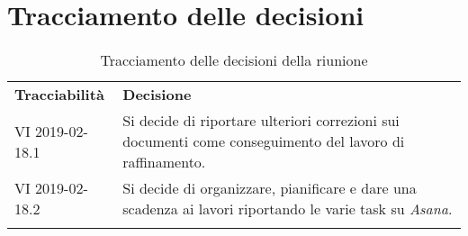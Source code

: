 \clearpage
\section{Tracciamento delle decisioni}
\begin{center}
	\renewcommand{\arraystretch}{1.5}
	\begin{longtable}{  p{2.8cm} p{11.4cm} }
		\rowcolor{tableHeadYellow}
		\textbf{Tracciabilità}&\textbf{Decisione}\\
		VI 2019-02-18.1 & Si decide di riportare ulteriori correzioni sui documenti come conseguimento del lavoro di raffinamento.\\
		VI 2019-02-18.2 & Si decide di organizzare, pianificare e dare una scadenza ai lavori riportando le varie task su \textit{Asana}.\\
		\rowcolor{white}
		\caption{Tracciamento delle decisioni della riunione}
	\end{longtable}	
\end{center}